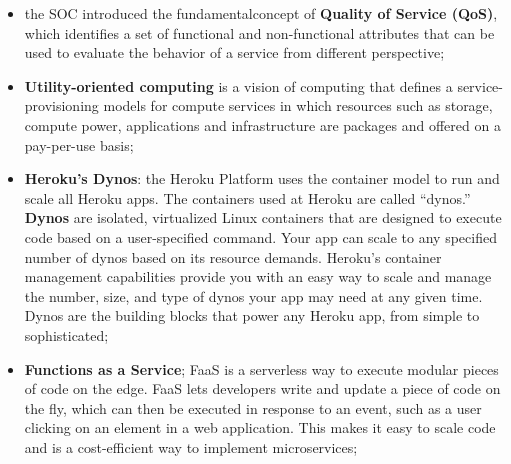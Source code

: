 \documentclass[oneside]{article}
\begin{document}
\begin{itemize}
    \item the SOC introduced the fundamentalconcept of \textbf{Quality of Service (QoS)}, which identifies a set of functional and non-functional attributes that can be used to evaluate the behavior of a service from different perspective;
    
    \item \textbf{Utility-oriented computing} is a vision of computing that defines a service-provisioning models for compute services in which resources such as storage, compute power, applications and infrastructure are packages and offered on a pay-per-use basis;
    
    \item \textbf{Heroku's Dynos}: the Heroku Platform uses the container model to run and scale all Heroku apps. The containers used at Heroku are called “dynos.” \textbf{Dynos} are isolated, virtualized Linux containers that are designed to execute code based on a user-specified command. Your app can scale to any specified number of dynos based on its resource demands. Heroku’s container management capabilities provide you with an easy way to scale and manage the number, size, and type of dynos your app may need at any given time. Dynos are the building blocks that power any Heroku app, from simple to sophisticated;
    
    \item \textbf{Functions as a Service}; FaaS is a serverless way to execute modular pieces of code on the edge. FaaS lets developers write and update a piece of code on the fly, which can then be executed in response to an event, such as a user clicking on an element in a web application. This makes it easy to scale code and is a cost-efficient way to implement microservices;
    

\end{itemize}
\end{document}
